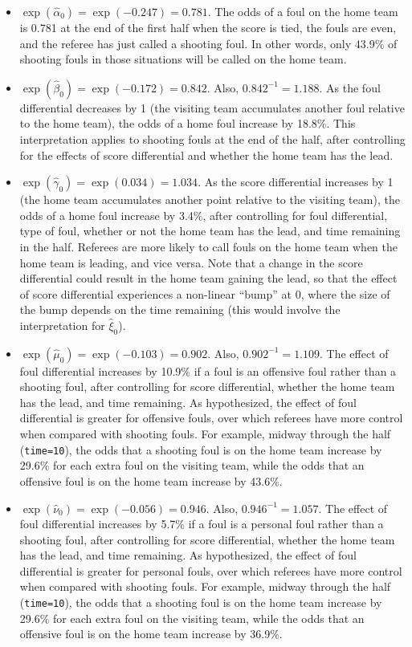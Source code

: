 \documentclass[
]{krantz}
\providecommand{\tightlist}{%
  \setlength{\itemsep}{0pt}\setlength{\parskip}{0pt}}
\begin{document}
\begin{itemize}
\tightlist
\item
  \(\exp(\hat{\alpha}_{0})=\exp(-0.247)=0.781\). The odds of a foul on the home team is 0.781 at the end of the first half when the score is tied, the fouls are even, and the referee has just called a shooting foul. In other words, only 43.9\% of shooting fouls in those situations will be called on the home team.
\item
  \(\exp(\hat{\beta}_{0})=\exp(-0.172)=0.842\). Also, \(0.842^{-1}=1.188\). As the foul differential decreases by 1 (the visiting team accumulates another foul relative to the home team), the odds of a home foul increase by 18.8\%. This interpretation applies to shooting fouls at the end of the half, after controlling for the effects of score differential and whether the home team has the lead.
\item
  \(\exp(\hat{\gamma}_{0})=\exp(0.034)=1.034\). As the score differential increases by 1 (the home team accumulates another point relative to the visiting team), the odds of a home foul increase by 3.4\%, after controlling for foul differential, type of foul, whether or not the home team has the lead, and time remaining in the half. Referees are more likely to call fouls on the home team when the home team is leading, and vice versa. Note that a change in the score differential could result in the home team gaining the lead, so that the effect of score differential experiences a non-linear ``bump'' at 0, where the size of the bump depends on the time remaining (this would involve the interpretation for \(\hat{\xi}_{0}\)).
\item
  \(\exp(\hat{\mu}_{0})=\exp(-0.103)=0.902\). Also, \(0.902^{-1}=1.109\). The effect of foul differential increases by 10.9\% if a foul is an offensive foul rather than a shooting foul, after controlling for score differential, whether the home team has the lead, and time remaining. As hypothesized, the effect of foul differential is greater for offensive fouls, over which referees have more control when compared with shooting fouls. For example, midway through the half (\texttt{time=10}), the odds that a shooting foul is on the home team increase by 29.6\% for each extra foul on the visiting team, while the odds that an offensive foul is on the home team increase by 43.6\%.
\item
  \(\exp(\hat{\nu}_{0})=\exp(-0.056)=0.946\). Also, \(0.946^{-1}=1.057\). The effect of foul differential increases by 5.7\% if a foul is a personal foul rather than a shooting foul, after controlling for score differential, whether the home team has the lead, and time remaining. As hypothesized, the effect of foul differential is greater for personal fouls, over which referees have more control when compared with shooting fouls. For example, midway through the half (\texttt{time=10}), the odds that a shooting foul is on the home team increase by 29.6\% for each extra foul on the visiting team, while the odds that an offensive foul is on the home team increase by 36.9\%.

\end{itemize}
\end{document}
